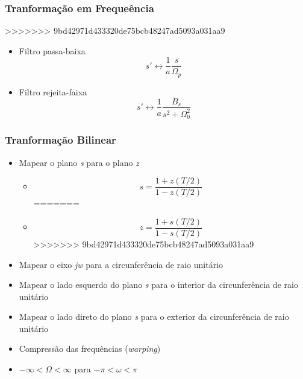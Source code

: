 \documentclass{beamer}
\begin{document}
\subsubsection{Tranforma\c{c}\~ao em Freque\^encia}
>>>>>>> 9bd42971d433320de75bcb48247ad5093a031aa9
	\begin{frame}
		\begin{itemize}
		 \item Filtro passa-baixa
			  \begin{equation}
			  s' \leftrightarrow \frac{1}{a} \frac{s}{\Omega_{p}}
			  \end{equation}
		 \item Filtro rejeita-faixa
			  \begin{equation}
			  s' \leftrightarrow \frac{1}{a} \frac{B_{s}}{s^{2} + \Omega_{0}^{2}}
			  \end{equation}
		\end{itemize}

	\end{frame}
	
\subsubsection{Tranforma\c{c}\~ao Bilinear}

	\begin{frame}
		\begin{itemize}
			\item Mapear o plano \textit{s} para o plano \textit{z}
				\begin{itemize}
<<<<<<< HEAD
				\item  		\[s = \frac{1+z(T/2)}{1-z(T/2)}\]
=======
				\item  		\[z = \frac{1+s(T/2)}{1-s(T/2)}\]
>>>>>>> 9bd42971d433320de75bcb48247ad5093a031aa9
				\end{itemize}
			\item Mapear o eixo \textit{jw} para a circunfer\^encia de raio unit\'ario
			\item Mapear o lado esquerdo do plano \textit{s} para o interior da circunfer\^encia de raio unit\'ario
			\item Mapear o lado direto do plano \textit{s} para o exterior da circunfer\^encia de raio unit\'ario
			\item Compress\~ao das frequ\^encias (\textit{warping})
			\item \(-\infty < \Omega < \infty\) para \(-\pi < \omega < \pi\)
		\end{itemize}

	\end{frame}
	
\end{document}
